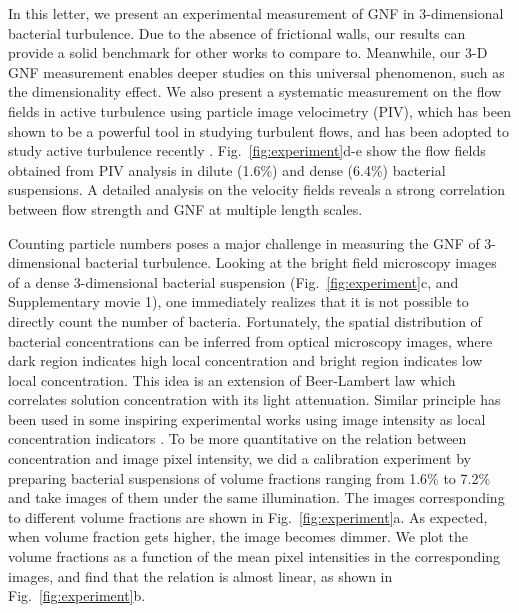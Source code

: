 \documentclass[twocolumn,aps,prl,amsmath,amssymb,longbibliography]{revtex4-2}
\begin{document}
In this letter, we present an experimental measurement of GNF in 3-dimensional bacterial turbulence. Due to the absence of frictional walls, our results can provide a solid benchmark for other works to compare to. Meanwhile, our 3-D GNF measurement enables deeper studies on this universal phenomenon, such as the dimensionality effect. We also present a systematic measurement on the flow fields in active turbulence using particle image velocimetry (PIV), which has been shown to be a powerful tool in studying turbulent flows, and has been adopted to study active turbulence recently
\cite{Ishikawa2011, Wensink2012, Sokolov2012, Sanchez2012, Dunkel2013a, Schaller2013, Peng2020}. 
Fig.~\ref{fig:experiment}d-e show the flow fields obtained from PIV analysis in dilute (1.6\%) and dense (6.4\%) bacterial suspensions. A detailed analysis on the velocity fields reveals a strong correlation between flow strength and GNF at multiple length scales.

Counting particle numbers poses a major challenge in measuring the GNF of 3-dimensional bacterial turbulence. Looking at the bright field microscopy images of a dense 3-dimensional bacterial suspension (Fig.~\ref{fig:experiment}c, and Supplementary movie 1), one immediately realizes that it is not possible to directly count the number of bacteria. Fortunately, the spatial distribution of bacterial concentrations can be inferred from optical microscopy images, where dark region indicates high local concentration and bright region indicates low local concentration. This idea is an extension of Beer-Lambert law which correlates solution concentration with its light attenuation. Similar principle has been used in some inspiring experimental works using image intensity as local concentration indicators \cite{Wilson2011, Schaller2013}. To be more quantitative on the relation between concentration and image pixel intensity, we did a calibration experiment by preparing bacterial suspensions of volume fractions ranging from 1.6\% to 7.2\% and take images of them under the same illumination. The images corresponding to different volume fractions are shown in Fig.~\ref{fig:experiment}a. As expected, when volume fraction gets higher, the image becomes dimmer. We plot the volume fractions as a function of the mean pixel intensities in the corresponding images, and find that the relation is almost linear, as shown in Fig.~\ref{fig:experiment}b.
\end{document}
